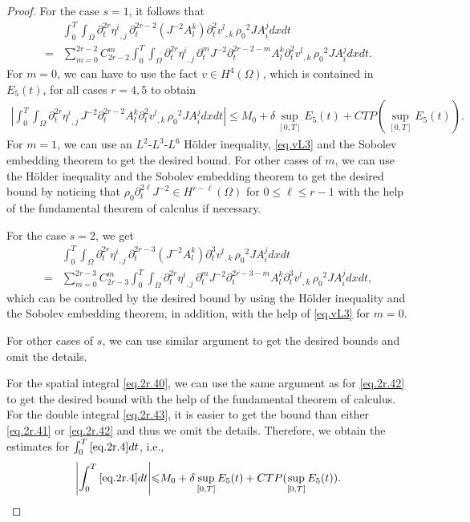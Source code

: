 \documentclass[12pt,twoside,reqno]{amsart}
\numberwithin{equation}{section}
\theoremstyle{definition}
\theoremstyle{remark}
\begin{document}
\begin{proof}
For the case $s=1$, it follows that
\begin{align*}
  &{\int_0^T\!\!\!\!\int_\Omega }{\partial}_t^{2r}{{{\eta^i}}_{,{j}}\,}{\partial}_t^{2r-2} (J^{-2}A_l^k){\partial}_t^2 {{{v^l}}_{,{k}}\,}{\rho_0}^2  J A^j_i dxdt\\
  =&\sum_{m=0}^{2r-2}C_{2r-2}^m{\int_0^T\!\!\!\!\int_\Omega }{\partial}_t^{2r}{{{\eta^i}}_{,{j}}\,} {\partial}_t^mJ^{-2}{\partial}_t^{2r-2-m} A_l^k{\partial}_t^2 {{{v^l}}_{,{k}}\,}{\rho_0}^2  J A^j_i dxdt.
\end{align*}
For $m=0$, we can have to use the fact $v\in H^4(\Omega)$, which is contained in $E_5(t)$, for all cases $r=4,5$ to obtain
\begin{align*}
  {\left\vert{{\int_0^T\!\!\!\!\int_\Omega }{\partial}_t^{2r}{{{\eta^i}}_{,{j}}\,} J^{-2}{\partial}_t^{2r-2} A_l^k{\partial}_t^2 {{{v^l}}_{,{k}}\,}{\rho_0}^2  J A^j_i dxdt}\right\vert}{\leqslant} M_0+\delta\sup_{[0,T]}E_5(t)+CTP(\sup_{[0,T]}E_5(t)).
\end{align*}
For $m=1$, we can use an $L^2$-$L^3$-$L^6$ H\"older inequality, \eqref{eq.vL3} and the Sobolev embedding theorem to get the desired bound. For other cases of $m$, we can use the H\"older inequality and the Sobolev embedding theorem to get the desired bound by noticing that ${\rho_0} {\partial}_t^{2\ell}J^{-2}\in H^{r-\ell}(\Omega)$ for $0{\leqslant} \ell{\leqslant} r-1$ with the help of the fundamental theorem of calculus if necessary.

For the case $s=2$, we get
\begin{align*}
  &{\int_0^T\!\!\!\!\int_\Omega }{\partial}_t^{2r}{{{\eta^i}}_{,{j}}\,}{\partial}_t^{2r-3} (J^{-2}A_l^k){\partial}_t^3 {{{v^l}}_{,{k}}\,}{\rho_0}^2  J A^j_i dxdt\\
  =&\sum_{m=0}^{2r-3}C_{2r-3}^m{\int_0^T\!\!\!\!\int_\Omega }{\partial}_t^{2r}{{{\eta^i}}_{,{j}}\,} {\partial}_t^mJ^{-2}{\partial}_t^{2r-3-m} A_l^k{\partial}_t^3 {{{v^l}}_{,{k}}\,}{\rho_0}^2  J A^j_i dxdt,
\end{align*}
which can be controlled by the desired bound by using the H\"older inequality and the Sobolev embedding theorem, in addition, with the help of \eqref{eq.vL3} for $m=0$.

For other cases of $s$, we can use similar argument to get the desired bounds and omit the details.

For the spatial integral \eqref{eq.2r.40}, we can use the same argument as for \eqref{eq.2r.42} to get the desired bound with the help of the fundamental theorem of calculus. For the double integral \eqref{eq.2r.43}, it is easier to get the bound than either \eqref{eq.2r.41} or \eqref{eq.2r.42} and thus we omit the details. Therefore, we obtain the estimates for $\int_0^T\eqref{eq.2r.4}dt$, i.e.,
\begin{align*}
  {\left\vert{\int_0^T\eqref{eq.2r.4}dt}\right\vert}{\leqslant} M_0+\delta \sup_{[0,T]}E_5(t)+CTP(\sup_{[0,T]}E_5(t)).
\end{align*}


\end{proof}
\end{document}
